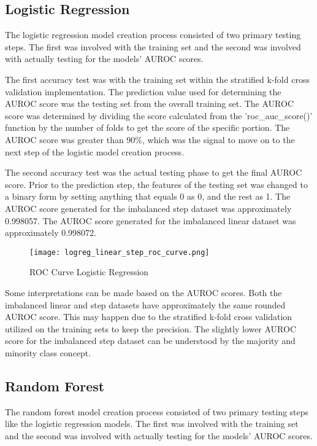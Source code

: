 \documentclass[conference]{IEEEtran}
\begin{document}
\subsection{Logistic Regression}
The logistic regression model creation process consisted of two primary testing steps. The first was involved with the training set and the second was involved with actually testing for the models' AUROC scores. 

The first accuracy test was with the training set within the stratified k-fold cross validation implementation. The prediction value used for determining the AUROC score was the testing set from the overall training set. The AUROC score was determined by dividing the score calculated from the 'roc\_auc\_score()' function by the number of folds to get the score of the specific portion. The AUROC score was greater than 90\%, which was the signal to move on to the next step of the logistic model creation process. 

The second accuracy test was the actual testing phase to get the final AUROC score. Prior to the prediction step, the features of the testing set was changed to a binary form by setting anything that equals 0 as 0, and the rest as 1. The AUROC score generated for the imbalanced step dataset was approximately 0.998057. The AUROC score generated for the imbalanced linear dataset was approximately 0.998072. 

\begin{figure}[htbp]
\centerline{\texttt{[image: logreg\_linear\_step\_roc\_curve.png]}}
\caption{ROC Curve Logistic Regression}
\label{fig}
\end{figure}

Some interpretations can be made based on the AUROC scores. Both the imbalanced linear and step datasets have approximately the same rounded AUROC score. This may happen due to the stratified k-fold cross validation utilized on the training sets to keep the precision. The slightly lower AUROC score for the imbalanced step dataset can be understood by the majority and minority class concept.   

\subsection{Random Forest}
The random forest model creation process consisted of two primary testing steps like the logistic regression models. The first was involved with the training set and the second was involved with actually testing for the models' AUROC scores.
\end{document}
